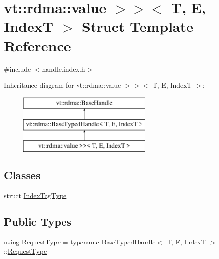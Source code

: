 \hypertarget{structvt_1_1rdma_1_1_handle_3_01_t_00_01_e_00_01_index_t_00_01typename_01std_1_1enable__if__t_3_f66c3940d9f3649c3a5c3e77d63c658a}{}\section{vt\+:\+:rdma\+:\+:value $>$$>$$<$ T, E, IndexT $>$ Struct Template Reference}
\label{structvt_1_1rdma_1_1_handle_3_01_t_00_01_e_00_01_index_t_00_01typename_01std_1_1enable__if__t_3_f66c3940d9f3649c3a5c3e77d63c658a}


{\ttfamily \#include $<$handle.\+index.\+h$>$}

Inheritance diagram for vt\+:\+:rdma\+:\+:value $>$$>$$<$ T, E, IndexT $>$\+:\begin{figure}[H]
\begin{center}
\leavevmode
\includegraphics[height=3.000000cm]{structvt_1_1rdma_1_1_handle_3_01_t_00_01_e_00_01_index_t_00_01typename_01std_1_1enable__if__t_3_f66c3940d9f3649c3a5c3e77d63c658a}
\end{center}
\end{figure}
\subsection*{Classes}
\begin{DoxyCompactItemize}
\item 
struct \hyperlink{structvt_1_1rdma_1_1_handle_3_01_t_00_01_e_00_01_index_t_00_01typename_01std_1_1enable__if__t_3_1ceedd6f8d829061f3897a02dba9ce2d}{Index\+Tag\+Type}
\end{DoxyCompactItemize}
\subsection*{Public Types}
\begin{DoxyCompactItemize}
\item 
using \hyperlink{structvt_1_1rdma_1_1_handle_3_01_t_00_01_e_00_01_index_t_00_01typename_01std_1_1enable__if__t_3_f66c3940d9f3649c3a5c3e77d63c658a_a7b884d1c3b2be49b47899ad24757710a}{Request\+Type} = typename \hyperlink{structvt_1_1rdma_1_1_base_typed_handle}{Base\+Typed\+Handle}$<$ T, E, IndexT $>$\+::\hyperlink{structvt_1_1rdma_1_1_base_typed_handle_a449c2c1948f5793c3fdfb1aba5801ed7}{Request\+Type}
\end{DoxyCompactItemize}
